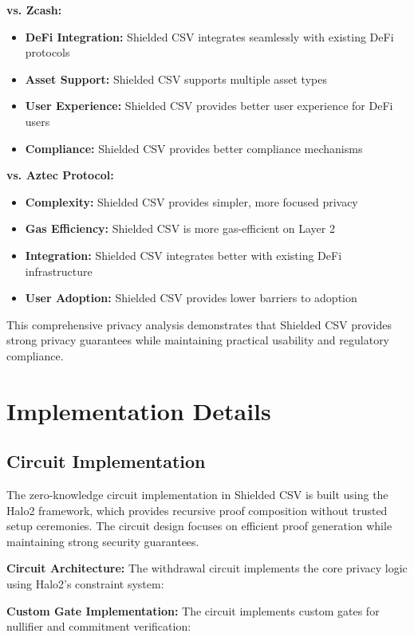 \documentclass[11pt,a4paper]{article}
\begin{document}
\textbf{vs. Zcash:}
\begin{itemize}
    \item \textbf{DeFi Integration:} Shielded CSV integrates seamlessly with existing DeFi protocols
    \item \textbf{Asset Support:} Shielded CSV supports multiple asset types
    \item \textbf{User Experience:} Shielded CSV provides better user experience for DeFi users
    \item \textbf{Compliance:} Shielded CSV provides better compliance mechanisms
\end{itemize}

\textbf{vs. Aztec Protocol:}
\begin{itemize}
    \item \textbf{Complexity:} Shielded CSV provides simpler, more focused privacy
    \item \textbf{Gas Efficiency:} Shielded CSV is more gas-efficient on Layer 2
    \item \textbf{Integration:} Shielded CSV integrates better with existing DeFi infrastructure
    \item \textbf{User Adoption:} Shielded CSV provides lower barriers to adoption
\end{itemize}

This comprehensive privacy analysis demonstrates that Shielded CSV provides strong privacy guarantees while maintaining practical usability and regulatory compliance.

\section{Implementation Details}

\subsection{Circuit Implementation}

The zero-knowledge circuit implementation in Shielded CSV is built using the Halo2 framework, which provides recursive proof composition without trusted setup ceremonies. The circuit design focuses on efficient proof generation while maintaining strong security guarantees.

\textbf{Circuit Architecture:}
The withdrawal circuit implements the core privacy logic using Halo2's constraint system:


\textbf{Custom Gate Implementation:}
The circuit implements custom gates for nullifier and commitment verification:
\end{document}
